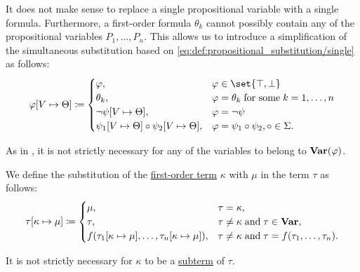 \begin{definition}
\begin{thmenum}
    It does not make sense to replace a single propositional variable with a single formula. Furthermore, a first-order formula \( \theta_k \) cannot possibly contain any of the propositional variables \( P_1, \ldots, P_n \). This allows us to introduce a simplification of the simultaneous substitution based on \eqref{eq:def:propositional_substitution/single} as follows:
    \begin{equation}\label{eq:def:first_order_substitution/propositional}
      \varphi[V \mapsto \Theta] \coloneqq \begin{cases}
        \varphi,                                                    &\varphi \in \set{ \top, \bot } \\
        \theta_k,                                                   &\varphi = \theta_k \T{for some} k = 1, \ldots, n \\
        \neg \psi[V \mapsto \Theta],                                &\varphi = \neg \psi \\
        \psi_1[V \mapsto \Theta] \bincirc \psi_2[V \mapsto \Theta], &\varphi = \psi_1 \bincirc \psi_2, \bincirc \in \Sigma.
      \end{cases}
    \end{equation}

    As in , it is not strictly necessary for any of the variables to belong to \( \operatorname{\mathbf{Var}}(\varphi) \).

     We define the substitution of the \hyperref[def:first_order_syntax/term]{first-order term} \( \kappa \) with \( \mu \) in the term \( \tau \) as follows:
    \begin{equation}\label{eq:def:first_order_substitution/term_in_term}
      \tau[\kappa \mapsto \mu] \coloneqq \begin{cases}
        \mu,                                                               &\tau = \kappa, \\
        \tau,                                                              &\tau \neq \kappa \T{and} \tau \in \boldop{Var}, \\
        f(\tau_1[\kappa \mapsto \mu], \ldots, \tau_n[\kappa \mapsto \mu]), &\tau \neq \kappa \T{and} \tau = f(\tau_1, \ldots, \tau_n).
      \end{cases}
    \end{equation}

    It is not strictly necessary for \( \kappa \) to be a \hyperref[def:first_order_syntax/subterm]{subterm} of \( \tau \).


\end{thmenum}
\end{definition}
